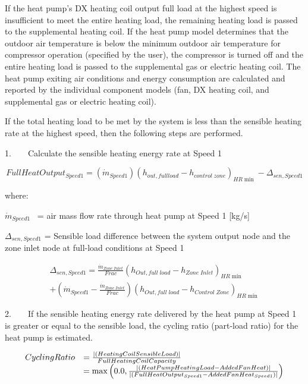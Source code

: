 If the heat pump's DX heating coil output full load at the highest speed is insufficient to meet the entire heating load, the remaining heating load is passed to the supplemental heating coil. If the heat pump model determines that the outdoor air temperature is below the minimum outdoor air temperature for compressor operation (specified by the user), the compressor is turned off and the entire heating load is passed to the supplemental gas or electric heating coil. The heat pump exiting air conditions and energy consumption are calculated and reported by the individual component models (fan, DX heating coil, and supplemental gas or electric heating coil).

If the total heating load to be met by the system is less than the sensible heating rate at the highest speed, then the following steps are performed.

1.~~~~Calculate the sensible heating energy rate at Speed 1

\begin{equation}
FullHeatOutpu{t_{Speed1}} = \left( {{{\dot m}_{Speed1}}} \right){\left( {{h_{out,fullload}} - {h_{control\;zone}}} \right)_{HR\min }} - {\Delta_{sen,Speed1}}
\end{equation}

where:

\emph{\({{{\dot m}_{Speed1}}}\)}~ = air mass flow rate through heat pump at Speed 1 {[}kg/s{]}

\(\Delta_{sen,Speed1}\) = Sensible load difference between the system output node and the zone inlet node at full-load conditions at Speed 1

\begin{equation}
\begin{split}
{\Delta_{sen,Speed1}} = \frac{{{{\dot m}_{Zone\;Inlet}}}}{{Frac}}{\left( {{h_{Out,full\;load}} - {h_{Zone\;Inlet}}} \right)_{HR\min }} \\
+ \left( {{{\dot m}_{Speed1}} - \frac{{{{\dot m}_{Zone\;Inlet}}}}{{Frac}}} \right){\left( {{h_{Out,full\;load}} - {h_{Control\;Zone}}} \right)_{HR\min }}
\end{split}
\end{equation}

2.~~~~If the sensible heating energy rate delivered by the heat pump at Speed 1 is greater or equal to the sensible load, the cycling ratio (part-load ratio) for the heat pump is estimated.

\begin{equation}
  \begin{array}{rl}
    CyclingRatio &= \frac{\left|\PB{HeatingCoilSensibleLoad}\right|}{FullHeatingCoilCapacity} \\
                 &= \max \PB{0.0, \frac{\left|\PB{HeatPumpHeatingLoad-AddedFanHeat}\right|}{\left|\PB{FullHeatOutput_{Speed1}-AddedFanHeat_{Speed1}}\right|} }
  \end{array}
\end{equation}

